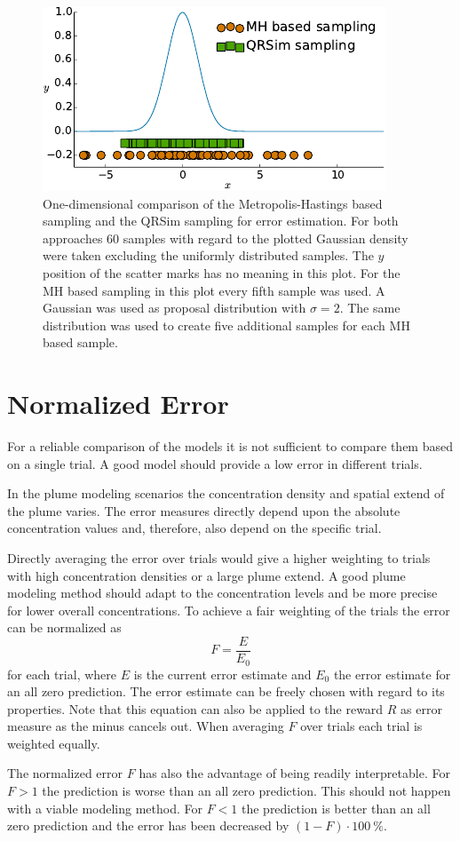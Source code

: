 \begin{figure}
    \centering
    \includegraphics{plots/err-sampling}
    \caption[Comparison of error estimation sampling methods]{One-dimensional 
        comparison of the Metropolis-Hastings based sampling and the QRSim 
        sampling for error estimation. For both approaches 60 samples with 
        regard to the plotted Gaussian density were taken excluding the 
        uniformly distributed samples.  The $y$ position of the scatter marks 
        has no meaning in this plot. For the MH based sampling in this plot 
        every fifth sample was used.  A Gaussian was used as proposal 
        distribution with $\sigma = 2$.  The same distribution was used to 
        create five additional samples for each MH based 
        sample.}\label{fig:err-sampling}
\end{figure}

\section{Normalized Error}
For a reliable comparison of the models it is not sufficient to compare them 
based on a single trial. A good model should provide a low error in different 
trials.

In the plume modeling scenarios the concentration density and spatial extend of 
the plume varies. The error measures directly depend upon the absolute 
concentration values and, therefore, also depend on the specific trial.

Directly averaging the error over trials would give a higher weighting to trials 
with high concentration densities or a large plume extend. A good plume 
modeling method should adapt to the concentration levels and be more precise 
for lower overall concentrations. To achieve a fair weighting of the trials the 
error can be normalized as
\begin{equation}
    F = \frac{E}{E_0}
\end{equation}
for each trial, where $E$ is the current error estimate and $E_0$ the error 
estimate for an all zero prediction. The error estimate can be freely chosen 
with regard to its properties. Note that this equation can also be applied to 
the reward $R$ as error measure as the minus cancels out. When averaging $F$ 
over trials each trial is weighted equally.

The normalized error $F$ has also the advantage of being readily interpretable.  
For $F > 1$ the prediction is worse than an all zero prediction.  This should 
not happen with a viable modeling method. For $F < 1$ the prediction is better 
than an all zero prediction and the error has been decreased by $(1 - F) \cdot 
\SI{100}{\percent}$.
